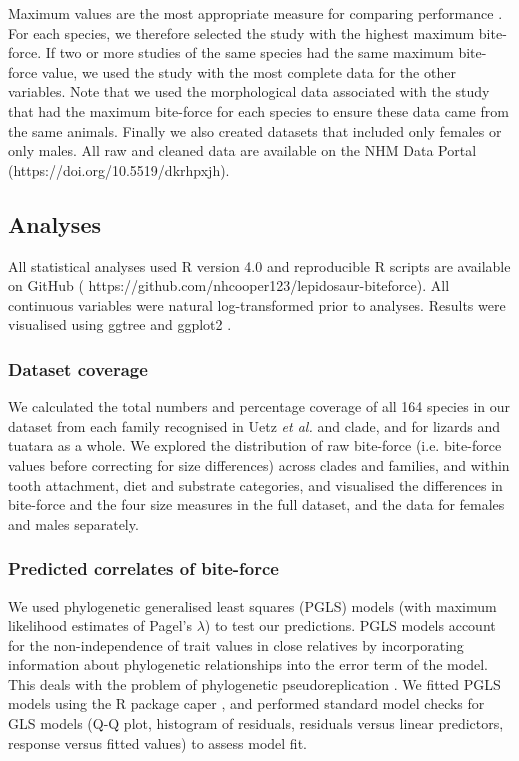 \documentclass[a4paper, 12pt]{article}
\begin{document}
Maximum values are the most appropriate measure for comparing performance \cite{hertz1988time,losos2002cautionary}. 
For each species, we therefore selected the study with the highest maximum bite-force. 
If two or more studies of the same species had the same maximum bite-force value, we used the study with the most complete data for the other variables. 
Note that we used the morphological data associated with the study that had the maximum bite-force for each species to ensure these data came from the same animals. 
Finally we also created datasets that included only females or only males. 
All raw and cleaned data are available on the NHM Data Portal (https://doi.org/10.5519/dkrhpxjh\cite{lepidosaurdata}). 

\subsection{Analyses}
All statistical analyses used R version 4.0 \cite{R-Core-Team:2020} and reproducible R scripts are available on GitHub ( https://github.com/nhcooper123/lepidosaur-biteforce). 
All continuous variables were natural log-transformed prior to analyses. 
Results were visualised using ggtree \cite{yu2017ggtree} and ggplot2 \cite{wickham2011ggplot2}.

\subsubsection{Dataset coverage}
We calculated the total numbers and percentage coverage of all 164 species in our dataset from each family recognised in Uetz \textit{et al.}\cite{uetz2020reptile} and clade\cite{burbrink2020interrogating}, and for lizards and tuatara as a whole.
We explored the distribution of raw bite-force (i.e. bite-force values before correcting for size differences) across clades and families, and within tooth attachment, diet and substrate categories, and visualised the differences in bite-force and the four size measures in the full dataset, and the data for females and males separately.

\subsubsection{Predicted correlates of bite-force}
We used phylogenetic generalised least squares (PGLS) models (with maximum likelihood estimates of Pagel’s $\lambda$) to test our predictions.
PGLS models account for the non-independence of trait values in close relatives by incorporating information about phylogenetic relationships into the error term of the model. This deals with the problem of phylogenetic pseudoreplication \cite{harvey1991comparative}. 
We fitted PGLS models using the R package caper \cite{orme2018caper}, and performed standard model checks for GLS models (Q-Q plot, histogram of residuals, residuals versus linear predictors, response versus fitted values) to assess model fit. 
\end{document}
